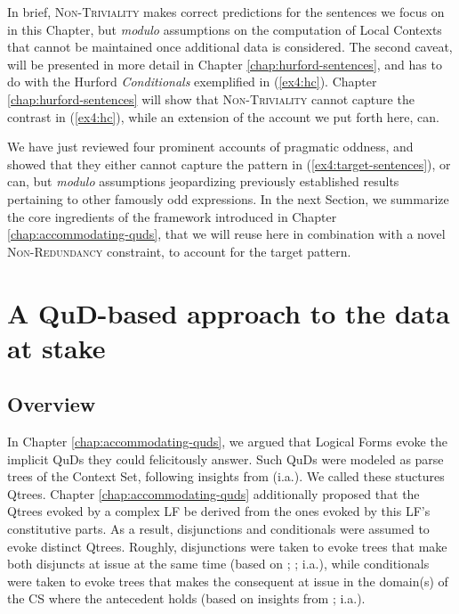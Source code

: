 In brief, \textsc{Non-Triviality} makes correct predictions for the sentences we focus on in this Chapter, but \textit{modulo} assumptions on the computation of Local Contexts that cannot be maintained once additional data is considered. The second caveat, will be presented in more detail in Chapter \ref{chap:hurford-sentences}, and has to do with the Hurford \textit{Conditionals} \citep{Mandelkern2018} exemplified in (\ref{ex4:hc}). Chapter \ref{chap:hurford-sentences} will show that \textsc{Non-Triviality} cannot capture the contrast in (\ref{ex4:hc}), while an extension of the account we put forth here, can.

\begin{exe}
	\ex \label{ex4:hc}
	\begin{xlist}
		\label{ex4:hc-sw}
		\label{ex4:hc-ws}
	\end{xlist}
\end{exe}


We have just reviewed four prominent accounts of pragmatic oddness, and showed that they either cannot capture the pattern in (\ref{ex4:target-sentences}), or can, but \textit{modulo} assumptions jeopardizing previously established results pertaining to other famously odd expressions. In the next Section, we summarize the core ingredients of the framework introduced in Chapter \ref{chap:accommodating-quds}, that we will reuse here in combination with a novel \textsc{Non-Redundancy} constraint, to account for the target pattern.






\section{A QuD-based approach to the data at stake}\label{sec4:my-account}
\subsection{Overview}

In Chapter \ref{chap:accommodating-quds}, we argued that Logical Forms evoke the implicit QuDs they could felicitously answer. Such QuDs were modeled as parse trees of the Context Set, following insights from \citet{Buring2003,Ippolito2019,Zhang2022} (i.a.). We called these stuctures Qtrees. Chapter \ref{chap:accommodating-quds} additionally proposed that the Qtrees evoked by a complex LF be derived from the ones evoked by this LF's constitutive parts. As a result, disjunctions and conditionals were assumed to evoke distinct Qtrees. Roughly, disjunctions were taken to evoke trees that make both disjuncts at issue at the same time (based on ; ;  i.a.), while conditionals were taken to evoke trees that makes the consequent at issue in the domain(s) of the CS where the antecedent holds (based on insights from ;  i.a.).\\

